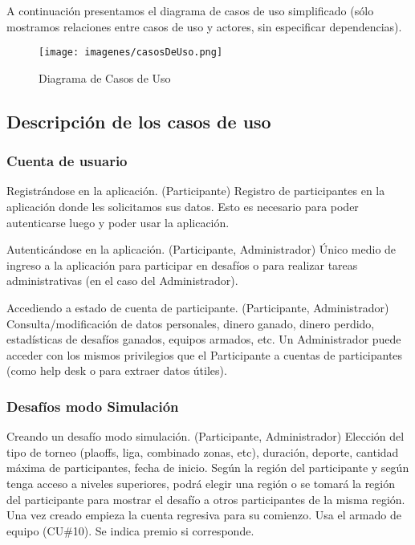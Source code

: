 A continuación presentamos el diagrama de casos de uso simplificado (sólo mostramos relaciones entre casos de uso y actores, sin especificar dependencias).

\begin{figure}[h!]
  \centering
  \texttt{[image: imagenes/casosDeUso.png]}
  \caption{Diagrama de Casos de Uso}
\end{figure}

\newpage

\subsection{Descripción de los casos de uso}

\subsubsection{Cuenta de usuario}
{Registrándose en la aplicación. (Participante)}
{Registro de participantes en la aplicación donde les solicitamos sus datos. Esto es necesario para poder autenticarse luego y poder usar la aplicación.}

{Autenticándose en la aplicación. (Participante, Administrador)}
{Único medio de ingreso a la aplicación para participar en desafíos o para realizar tareas administrativas (en el caso del Administrador).}

{Accediendo a estado de cuenta de participante. (Participante, Administrador)}
{Consulta/modificación de datos personales, dinero ganado, dinero perdido, estadísticas de desafíos ganados, equipos armados, etc. Un Administrador puede acceder con los mismos privilegios que el Participante a cuentas de participantes (como help desk o para extraer datos útiles).}

\subsubsection{Desafíos modo Simulación}

{Creando un desafío modo simulación. (Participante, Administrador)}
{Elección del tipo de torneo (plaoffs, liga, combinado zonas, etc), duración, deporte, cantidad máxima de participantes, fecha de inicio. Según la región del participante y según tenga acceso a niveles superiores, podrá elegir una región o se tomará la región del participante para mostrar el desafío a otros participantes de la misma región. Una vez creado empieza la cuenta regresiva para su comienzo. Usa el armado de equipo (CU\#10). Se indica premio si corresponde.}

